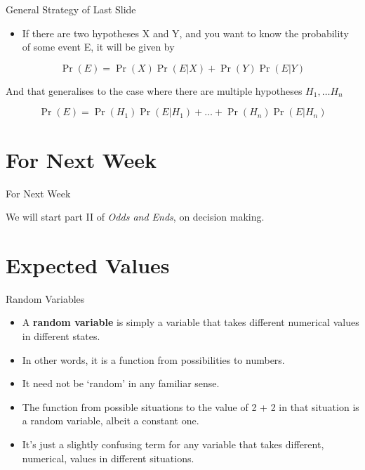\documentclass[
  ignorenonframetext,
]{beamer}
\providecommand{\tightlist}{%
  \setlength{\itemsep}{0pt}\setlength{\parskip}{0pt}}
\renewcommand{\,}{\text{, }}
\begin{document}
\begin{frame}{General Strategy of Last Slide}
\protect\hypertarget{general-strategy-of-last-slide}{}

\begin{itemize}
\tightlist
\item
  If there are two hypotheses X and Y, and you want to know the
  probability of some event E, it will be given by
\end{itemize}

\[
\Pr(E) = \Pr(X)\Pr(E | X) + \Pr(Y)\Pr(E | Y)
\]

And that generalises to the case where there are multiple hypotheses
\(H_1, \dots H_n\)

\[
\Pr(E) = \Pr(H_1)\Pr(E | H_1) + \dots +  \Pr(H_n)\Pr(E | H_n)
\]

\end{frame}

\hypertarget{for-next-week}{%
\section{For Next Week}\label{for-next-week}}

\begin{frame}{For Next Week}
\protect\hypertarget{for-next-week-1}{}

We will start part II of \emph{Odds and Ends}, on decision making.

\end{frame}

\hypertarget{expected-values}{%
\section{Expected Values}\label{expected-values}}

\begin{frame}{Random Variables}
\protect\hypertarget{random-variables}{}

\begin{itemize}
\tightlist
\item
  A \textbf{random variable} is simply a variable that takes different
  numerical values in different states.
\item
  In other words, it is a function from possibilities to numbers.
\item
  It need not be `random' in any familiar sense.
\item
  The function from possible situations to the value of 2 + 2 in that
  situation is a random variable, albeit a constant one.
\item
  It's just a slightly confusing term for any variable that takes
  different, numerical, values in different situations.
\end{itemize}

\end{frame}
\end{document}
